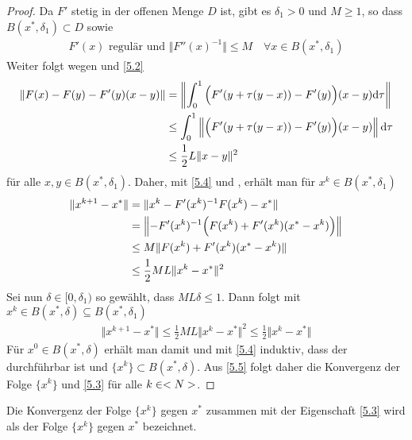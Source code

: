 \begin{proof}
	Da $F'$ stetig in der offenen Menge $D$ ist, gibt es $\delta_1>0$ und $M\ge 1$, so dass $B(x^\ast,\delta_1)\subset D$ sowie
	\begin{align}
		\label{5.4}
		F'(x)\text{ regulär und } \Vert F''(x)^{-1}\Vert\le M \quad\forall x\in B(x^\ast,\delta_1)
	\end{align}
	Weiter folgt wegen  und \cref{5.2}
	\begin{align}
		\Vert F(x) - F(y) - F'(y)(x-y)\Vert &= \left\Vert \int_0^1 \Big(F'(y+\tau(y-x)) - F'(y)\Big)(x-y)\mathrm{d} \tau\right\Vert \notag \\
		&\le \int_0^1 \left\Vert \Big(F'(y+\tau(y-x)) - F'(y)\Big)(x-y) \right\Vert\mathrm{d}\tau \notag \\
		&\le \frac{1}{2} L\Vert x-y\Vert^2 \notag
	\end{align}
	für alle $x,y\in B(x^\ast,\delta_1)$. Daher, mit \cref{5.4} und , erhält man für $x^k\in B(x^\ast,\delta_1)$
	\begin{align}
		\Vert x^{k+1}-x^\ast\Vert &= \Vert x^k - F'(x^k)^{-1}F(x^k) - x^\ast\Vert \notag \\
		&= \left\Vert -F'(x^k)^{-1}\Big(F(x^k) + F'(x ^k)(x^\ast-x^k)\Big)\right\Vert \notag \\
		&\le M\Vert F(x^k) + F'(x^k)(x^\ast-x^k)\Vert \notag \\
		&\le \frac{1}{2}ML\Vert x^k-x^\ast\Vert^2\notag
	\end{align}
	Sei nun $\delta\in [0,\delta_1)$ so gewählt, dass $ML\delta\le 1$. Dann folgt mit $x^k\in B(x^\ast,\delta)\subseteq B(x^\ast,\delta_1)$
	\begin{align}
		\label{5.5}
		\Vert x^{k+1}-x^\ast\Vert \le \frac{1}{2}ML\Vert x^k-x^\ast\Vert^2\le \frac{1}{2}\Vert x^k-x^\ast\Vert
	\end{align}
	Für $x^0\in B(x^\ast,\delta)$ erhält man damit und mit \cref{5.4} induktiv, dass der  durchführbar ist und $\{x^k\}\subset B(x^\ast,\delta)$. Aus \cref{5.5} folgt daher die Konvergenz der Folge $\{x^k\}$ und \cref{5.3} für alle $k\in<N>$.
\end{proof}

Die Konvergenz der Folge $\{x^k\}$ gegen $x^\ast$ zusammen mit der Eigenschaft \cref{5.3} wird als  der Folge $\{x^k\}$ gegen $x^\ast$ bezeichnet.